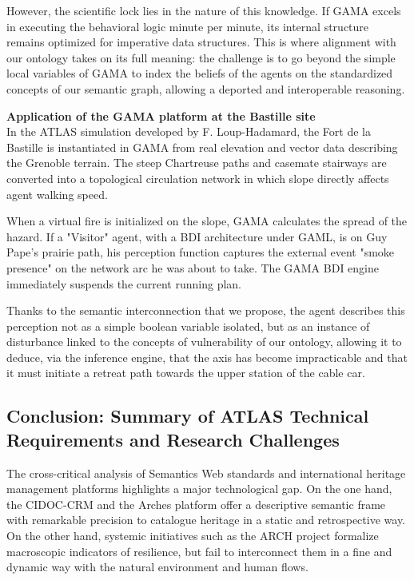 \documentclass{article}
\begin{document}
However, the scientific lock lies in the nature of this knowledge. If GAMA excels in executing the behavioral logic minute per minute, its internal structure remains optimized for imperative data structures. This is where alignment with our ontology takes on its full meaning: the challenge is to go beyond the simple local variables of GAMA to index the beliefs of the agents on the standardized concepts of our semantic graph, allowing a deported and interoperable reasoning.

\begin{filrouge}
\textbf{Application of the GAMA platform at the Bastille site} \\
In the ATLAS simulation developed by F. Loup-Hadamard, the Fort de la Bastille is instantiated in GAMA from real elevation and vector data describing the Grenoble terrain. The steep Chartreuse paths and casemate stairways are converted into a topological circulation network in which slope directly affects agent walking speed.

When a virtual fire is initialized on the slope, GAMA calculates the spread of the hazard. If a "Visitor" agent, with a BDI architecture under GAML, is on Guy Pape's prairie path, his perception function captures the external event "smoke presence" on the network arc he was about to take. The GAMA BDI engine immediately suspends the current running plan.

Thanks to the semantic interconnection that we propose, the agent describes this perception not as a simple boolean variable isolated, but as an instance of disturbance linked to the concepts of vulnerability of our ontology, allowing it to deduce, via the inference engine, that the axis has become impracticable and that it must initiate a retreat path towards the upper station of the cable car.
\end{filrouge}
\subsection{Conclusion: Summary of ATLAS Technical Requirements and Research Challenges}
\label{subsec:conclusion_besoins_techniques}

The cross-critical analysis of Semantics Web standards and international heritage management platforms highlights a major technological gap. On the one hand, the CIDOC-CRM and the Arches platform offer a descriptive semantic frame with remarkable precision to catalogue heritage in a static and retrospective way. On the other hand, systemic initiatives such as the ARCH project formalize macroscopic indicators of resilience, but fail to interconnect them in a fine and dynamic way with the natural environment and human flows.
\end{document}
